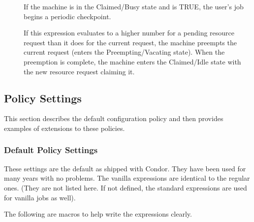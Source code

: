 \begin{description}
\item[] If the machine is in the
  Claimed/Busy state and  is TRUE, the
  user's job begins a periodic checkpoint.
  
\item[] If this expression evaluates to a higher number for
  a pending resource request than it does for the current request, the
  machine preempts the current request (enters the
  Preempting/Vacating state).  When the preemption is complete, the
  machine enters the Claimed/Idle state with the new resource
  request claiming it.

\end{description}

\subsection{\label{sec:Policy-Settings}Policy Settings}

This section describes the default configuration
policy and then provides examples of extensions to these
policies.

\subsubsection{\label{sec:Default-Policy}Default Policy Settings}

These settings are the default as shipped with Condor.  They have been
used for many years with no problems.  The vanilla expressions are
identical to the regular ones. (They are not listed here.  If
not defined, the standard expressions are used for vanilla jobs
as well).

The following are macros to help write the expressions
clearly.

